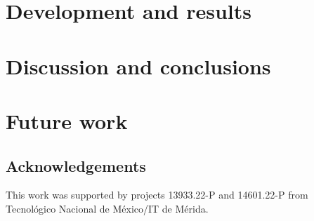 \documentclass{svproc}
\begin{document}
\section{Development and results}\label{Sec:DesarrolloResultados}

\section{Discussion and conclusions}\label{Sec:Concl}

\section{Future work}\label{Sec:TrabajoFuturo}

\subsection*{Acknowledgements} This work was supported by projects 13933.22-P and 14601.22-P from Tecnológico Nacional de México/IT de Mérida.

{

% 

}
\end{document}
